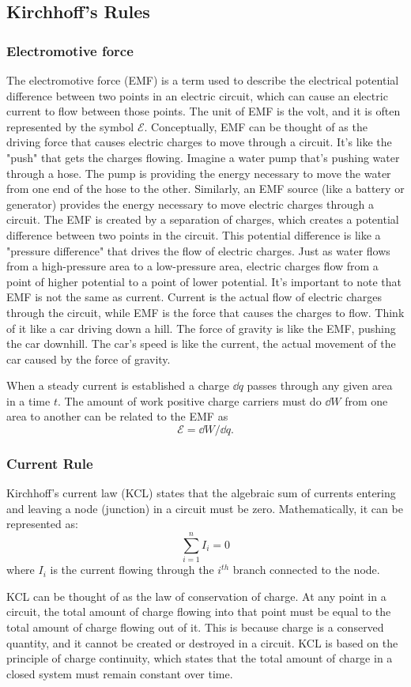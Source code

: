 \documentclass[12pt]{article}
\begin{document}
  \subsection{Kirchhoff's Rules}
  \subsubsection{Electromotive force}
  The electromotive force (EMF) is a term used to describe the electrical potential difference between two points in an electric circuit, which can cause an electric current to flow between those points. The unit of EMF is the volt, and it is often represented by the symbol $\mathcal E$. Conceptually, EMF can be thought of as the driving force that causes electric charges to move through a circuit. It's like the "push" that gets the charges flowing. Imagine a water pump that's pushing water through a hose. The pump is providing the energy necessary to move the water from one end of the hose to the other. Similarly, an EMF source (like a battery or generator) provides the energy necessary to move electric charges through a circuit. The EMF is created by a separation of charges, which creates a potential difference between two points in the circuit. This potential difference is like a "pressure difference" that drives the flow of electric charges. Just as water flows from a high-pressure area to a low-pressure area, electric charges flow from a point of higher potential to a point of lower potential. It's important to note that EMF is not the same as current. Current is the actual flow of electric charges through the circuit, while EMF is the force that causes the charges to flow. Think of it like a car driving down a hill. The force of gravity is like the EMF, pushing the car downhill. The car's speed is like the current, the actual movement of the car caused by the force of gravity.

  When a steady current is established a charge $\dd q$ passes through any given area in a time $t$. The amount of work positive charge carriers must do $\dd W$ from one area to another can be related to the EMF as 
  \[\mathcal E = \dd W/\dd q.\]
  \subsubsection{Current Rule}
  \begin{idea}
Kirchhoff's current law (KCL) states that the algebraic sum of currents entering and leaving a node (junction) in a circuit must be zero. Mathematically, it can be represented as:
\[\sum_{i = 1}^{n} I_i = 0\]
where $I_i$ is the current flowing through the $i^{th}$ branch connected to the node. 
\end{idea}
KCL can be thought of as the law of conservation of charge. At any point in a circuit, the total amount of charge flowing into that point must be equal to the total amount of charge flowing out of it. This is because charge is a conserved quantity, and it cannot be created or destroyed in a circuit. KCL is based on the principle of charge continuity, which states that the total amount of charge in a closed system must remain constant over time.
\end{document}
